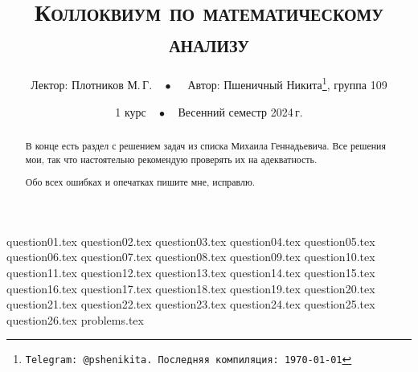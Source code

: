 \documentclass[a4paper, 11pt]{article}
\begin{document}
\title{\bfseries\scshape Коллоквиум по математическому анализу}
\date{1 курс$\quad\bullet\quad$Весенний семестр 2024\,г.}
\author{Лектор: Плотников М.\,Г.$\quad\bullet\quad$ Автор: Пшеничный Никита\thanks{\texttt{Telegram: @pshenikita. Последняя компиляция: \today}}, группа 109}

\maketitle

\begin{abstract}
    В конце есть раздел с решением задач из списка Михаила Геннадьевича. Все решения мои, так что настоятельно рекомендую проверять их на адекватность.

    Обо всех ошибках и опечатках пишите мне, исправлю.
\end{abstract}

\tableofcontents

\newpage

{question01.tex}
{question02.tex}
{question03.tex}
{question04.tex}
{question05.tex}
{question06.tex}
{question07.tex}
{question08.tex}
{question09.tex}
{question10.tex}
{question11.tex}
{question12.tex}
{question13.tex}
{question14.tex}
{question15.tex}
{question16.tex}
{question17.tex}
{question18.tex}
{question19.tex}
{question20.tex}
{question21.tex}
{question22.tex}
{question23.tex}
{question24.tex}
{question25.tex}
{question26.tex}
{problems.tex}
\end{document}
